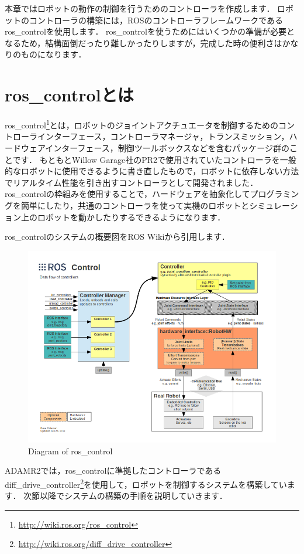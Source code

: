 \documentclass[{../../master}]{subfiles}
\begin{document}
本章ではロボットの動作の制御を行うためのコントローラを作成します．
ロボットのコントローラの構築には，ROSのコントローラフレームワークである\textsf{ros\_control}を使用します．
\textsf{ros\_control}を使うためにはいくつかの準備が必要となるため，結構面倒だったり難しかったりしますが，完成した時の便利さはかなりのものになります．

\section{\textsf{ros\_control}とは}

\textsf{ros\_control}\footnote{\url{http://wiki.ros.org/ros_control}}とは，ロボットのジョイントアクチュエータを制御するためのコントローラインターフェース，コントローラマネージャ，トランスミッション，ハードウェアインターフェース，制御ツールボックスなどを含むパッケージ群のことです．
もともとWillow Garage社のPR2で使用されていたコントローラを一般的なロボットに使用できるように書き直したもので，ロボットに依存しない方法でリアルタイム性能を引き出すコントローラとして開発されました．
\textsf{ros\_control}の枠組みを使用することで，ハードウェアを抽象化してプログラミングを簡単にしたり，共通のコントローラを使って実機のロボットとシミュレーション上のロボットを動かしたりするできるようになります．

\textsf{ros\_control}のシステムの概要図をROS Wikiから引用します．

\begin{figure}[ht]
  \centering
  \includegraphics[height=70truemm]{images/ros_control_diagram.png}
  \caption{Diagram of \textsf{ros\_control}}
  \label{fig:ros_control_diagram}
\end{figure}

ADAMR2では，\textsf{ros\_control}に準拠したコントローラである\textsf{diff\_drive\_controller}\footnote{\url{http://wiki.ros.org/diff_drive_controller}}を使用して，ロボットを制御するシステムを構築しています．
次節以降でシステムの構築の手順を説明していきます．
\end{document}

